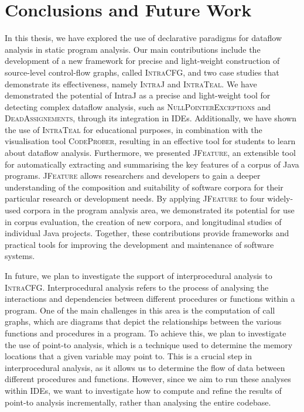 \section{Conclusions and Future Work}%
\label{sec:kappa:conclusions}%
In this thesis, we have explored the use of declarative paradigms for
dataflow analysis in static program analysis. Our main contributions include the
development of a new framework for precise and light-weight construction of source-level
control-flow graphs, called \textsc{IntraCFG}, and two case studies that demonstrate
its effectiveness, namely \textsc{IntraJ} and \textsc{IntraTeal}.
We have demonstrated the potential of IntraJ as a precise and light-weight tool
for detecting complex dataflow analysis, such as \textsc{NullPointerExceptions} and \textsc{DeadAssignements},
through its integration in IDEs. Additionally, we have shown the use of \textsc{IntraTeal}
for educational purposes, in combination with the visualisation tool \textsc{CodeProber},
resulting in an effective tool for students to learn about dataflow analysis.
Furthermore, we presented  \textsc{JFeature}, an extensible tool for automatically
extracting and summarising the key features of a corpus of Java programs.
\textsc{JFeature} allows researchers and developers to gain a deeper understanding of the composition and
suitability of software corpora for their particular research or development needs.
By applying \textsc{JFeature} to four widely-used corpora in the program analysis area,
we demonstrated its potential for use in corpus evaluation, the creation of new
corpora, and longitudinal studies of individual Java projects.
Together, these contributions provide frameworks and practical tools
for improving the development and maintenance of software systems.


In future, we plan to investigate the support of interprocedural analysis
to \textsc{IntraCFG}. Interprocedural analysis refers to the process of analysing
the interactions and dependencies between different procedures or functions within a
program. One of the main challenges in this area is the computation of call graphs,
which are diagrams that depict the relationships between the various functions and
procedures in a program.
To achieve this, we plan to investigate the use of point-to analysis, which is a
technique used to determine the memory locations that a given variable may point to.
This is a crucial step in interprocedural analysis, as it allows us to determine
the flow of data between different procedures and functions. However, since we aim
to run these analyses within IDEs, we want to investigate how to compute and refine
the results of point-to analysis incrementally, rather than analysing the entire codebase.

